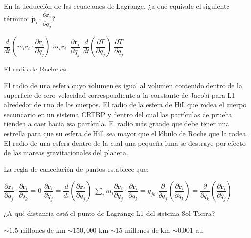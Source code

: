 \documentclass[12pt,addpoints]{exam}
\begin{document}
\vspace{0.5cm}
\begin{questions}

\question En la deducción de las ecuaciones de Lagrange, ¿a qué equivale el siguiente término: $\dot{\mathbf{p}}_i \cdot \dfrac{\partial \mathbf{r}_i}{\partial q_j}$?
\begin{choices}
\choice $\dfrac{d}{dt}\left(m_i \dot{\mathbf{r}}_i \cdot \dfrac{\partial \mathbf{r}_i}{\partial q_j}\right)$
\choice $m_i \ddot{\mathbf{r}}_i \cdot \dfrac{\partial \mathbf{r}_i}{\partial q_j}$
\choice $\dfrac{d}{dt}\left(\dfrac{\partial T}{\partial \dot{q}_j}\right)$
\choice $\dfrac{\partial T}{\partial q_j}$
\end{choices}

\question El radio de Roche es:
\begin{choices}
\choice El radio de una esfera cuyo volumen es igual al volumen contenido dentro de la superficie de cero velocidad correspondiente a la constante de Jacobi para L1 alrededor de uno de los cuerpos.
\choice El radio de la esfera de Hill que rodea el cuerpo secundario en un sistema CRTBP y dentro del cual las partículas de prueba tienden a caer hacia esa partícula.
\choice El radio más grande que debe tener una estrella para que su esfera de Hill sea mayor que el lóbulo de Roche que la rodea.
\choice El radio de una esfera dentro de la cual una pequeña luna se destruye por efecto de las mareas gravitacionales del planeta.
\end{choices}

\question La regla de cancelación de puntos establece que:
\begin{choices}
\choice $\dfrac{\partial \mathbf{r}_i}{\partial q_j} \cdot \dfrac{\partial \mathbf{r}_i}{\partial \dot{q}_k} = 0$
\choice $\dfrac{\partial \dot{\mathbf{r}}_i}{\partial q_j} = \dfrac{d}{dt} \left( \dfrac{\partial \mathbf{r}_i}{\partial q_j} \right)$
\choice $\sum_i m_i \dfrac{\partial \mathbf{r}_i}{\partial q_j} \cdot \dfrac{\partial \mathbf{r}_i}{\partial q_k} = g_{jk}$
\choice $\dfrac{\partial}{\partial q_j} \left( \dfrac{\partial \mathbf{r}_i}{\partial q_k} \right) = \dfrac{\partial}{\partial q_k} \left( \dfrac{\partial \mathbf{r}_i}{\partial q_j} \right)$
\end{choices}

\question ¿A qué distancia está el punto de Lagrange L1 del sistema Sol-Tierra?
\begin{choices}
\choice $\sim 1.5$ millones de km
\choice $\sim 150,000$ km
\choice $\sim 15$ millones de km
\choice $\sim 0.001$ au
\end{choices}


\end{questions}
\end{document}

